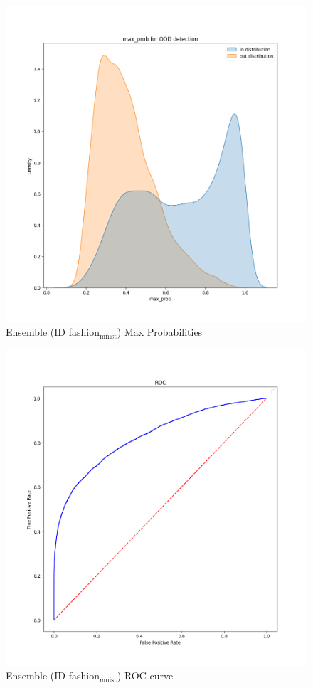 \documentclass[11pt]{article}
\begin{document}
\begin{figure}[htbp]
\centering
\includegraphics[width=.9\linewidth]{./ens_fash_max_prob.png}
\caption{\label{fig:orgb9eb82d}
Ensemble (ID fashion\(_{\text{mnist}}\)) Max Probabilities}
\end{figure}

\begin{figure}[htbp]
\centering
\includegraphics[width=.9\linewidth]{./ens_fash_roc.png}
\caption{\label{fig:org279ec8c}
Ensemble (ID fashion\(_{\text{mnist}}\)) ROC curve}
\end{figure}
\end{document}
